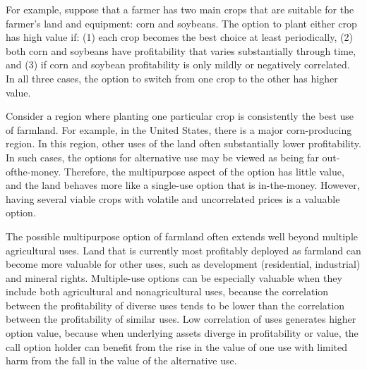 \documentclass[11pt]{article}
\begin{document}
For example, suppose that a farmer has two main crops that are suitable for the farmer's land and equipment: corn and soybeans. The option to plant either crop has high value if: (1) each crop becomes the best choice at least periodically, (2) both corn and soybeans have profitability that varies substantially through time, and (3) if corn and soybean profitability is only mildly or negatively correlated. In all three cases, the option to switch from one crop to the other has higher value.

Consider a region where planting one particular crop is consistently the best use of farmland. For example, in the United States, there is a major corn-producing region. In this region, other uses of the land often substantially lower profitability. In such cases, the options for alternative use may be viewed as being far out-ofthe-money. Therefore, the multipurpose aspect of the option has little value, and the land behaves more like a single-use option that is in-the-money. However, having several viable crops with volatile and uncorrelated prices is a valuable option.

The possible multipurpose option of farmland often extends well beyond multiple agricultural uses. Land that is currently most profitably deployed as farmland can become more valuable for other uses, such as development (residential, industrial) and mineral rights. Multiple-use options can be especially valuable when they include both agricultural and nonagricultural uses, because the correlation between the profitability of diverse uses tends to be lower than the correlation between the profitability of similar uses. Low correlation of uses generates higher option value, because when underlying assets diverge in profitability or value, the call option holder can benefit from the rise in the value of one use with limited harm from the fall in the value of the alternative use.
\end{document}
